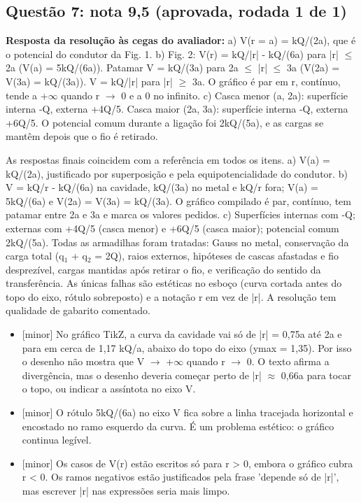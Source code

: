 \documentclass{article}%
\begin{document}
\subsection*{Questão 7: nota 9,5 (aprovada, rodada 1 de 1)}%
\textbf{Resposta da resolução às cegas do avaliador:} a) V(r = a) = kQ/(2a), que é o potencial do condutor da Fig. 1.\newline%
b) Fig. 2: V(r) = kQ/|r| - kQ/(6a) para |r| $\leq$ 2a (V(a) = 5kQ/(6a)). Patamar V = kQ/(3a) para 2a $\leq$ |r| $\leq$ 3a (V(2a) = V(3a) = kQ/(3a)). V = kQ/|r| para |r| $\geq$ 3a. O gráfico é par em r, contínuo, tende a +$\infty$ quando r $\to$ 0 e a 0 no infinito.\newline%
c) Casca menor (a, 2a): superfície interna -Q, externa +4Q/5. Casca maior (2a, 3a): superfície interna -Q, externa +6Q/5. O potencial comum durante a ligação foi 2kQ/(5a), e as cargas se mantêm depois que o fio é retirado.\par %
As respostas finais coincidem com a referência em todos os itens. a) V(a) = kQ/(2a), justificado por superposição e pela equipotencialidade do condutor. b) V = kQ/r - kQ/(6a) na cavidade, kQ/(3a) no metal e kQ/r fora; V(a) = 5kQ/(6a) e V(2a) = V(3a) = kQ/(3a). O gráfico compilado é par, contínuo, tem patamar entre 2a e 3a e marca os valores pedidos. c) Superfícies internas com -Q; externas com +4Q/5 (casca menor) e +6Q/5 (casca maior); potencial comum 2kQ/(5a). Todas as armadilhas foram tratadas: Gauss no metal, conservação da carga total (q$_{1}$ + q$_{2}$ = 2Q), raios externos, hipóteses de cascas afastadas e fio desprezível, cargas mantidas após retirar o fio, e verificação do sentido da transferência. As únicas falhas são estéticas no esboço (curva cortada antes do topo do eixo, rótulo sobreposto) e a notação r em vez de |r|. A resolução tem qualidade de gabarito comentado.%
\begin{itemize}%
\item%
{[}minor{]} No gráfico TikZ, a curva da cavidade vai só de |r| = 0,75a até 2a e para em cerca de 1,17 kQ/a, abaixo do topo do eixo (ymax = 1,35). Por isso o desenho não mostra que V $\to$ +$\infty$ quando r $\to$ 0. O texto afirma a divergência, mas o desenho deveria começar perto de |r| $\approx$ 0,66a para tocar o topo, ou indicar a assíntota no eixo V.%
\item%
{[}minor{]} O rótulo 5kQ/(6a) no eixo V fica sobre a linha tracejada horizontal e encostado no ramo esquerdo da curva. É um problema estético: o gráfico continua legível.%
\item%
{[}minor{]} Os casos de V(r) estão escritos só para r > 0, embora o gráfico cubra r < 0. Os ramos negativos estão justificados pela frase 'depende só de |r|', mas escrever |r| nas expressões seria mais limpo.%
\end{itemize}%
\end{document}
